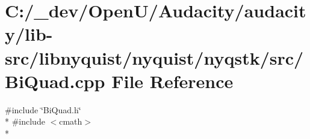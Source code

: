 \hypertarget{lib-src_2libnyquist_2nyquist_2nyqstk_2src_2_bi_quad_8cpp}{}\section{C\+:/\+\_\+dev/\+Open\+U/\+Audacity/audacity/lib-\/src/libnyquist/nyquist/nyqstk/src/\+Bi\+Quad.cpp File Reference}
\label{lib-src_2libnyquist_2nyquist_2nyqstk_2src_2_bi_quad_8cpp}
{\ttfamily \#include \char`\"{}Bi\+Quad.\+h\char`\"{}}\\*
{\ttfamily \#include $<$cmath$>$}\\*
